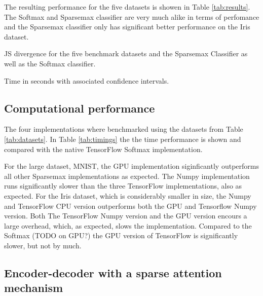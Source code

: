 The resulting performance for the five datasets is showen in Table \ref{tab:results}. The Softmax and Sparsemax classifier are very much alike in terms of perfomance and the Sparsemax classifier only has significant better performance on the Iris dataset.
\begin{table}[H]
\centering

\caption{JS divergence for the five benchmark datasets and the Sparsemax Classifier as well as the Softmax classifier.}
\label{tab:results}
\end{table}

\begin{table}
\centering

\caption{Time in seconds with associated confidence intervals.}
\label{tab:timings}
\end{table}

\subsection{Computational performance}
The four implementations where benchmarked using the datasets from Table \ref{tab:datasets}. In Table \ref{tab:timings} the the time performance is shown and compared with the native TensorFlow Softmax implementation.

For the large dataset, MNIST, the GPU implementation siginficantly outperforms all other Sparsemax implementations as expected. The Numpy implementation runs significantly slower than the three TensorFlow implementations, also as expected. For the Iris dataset, which is considerably smaller in size, the Numpy and TensorFlow CPU version outperforms both the GPU and Tensorflow Numpy version. Both The TensorFlow Numpy version and the GPU version encours a large overhead, which, as expected, slows the implementation. Compared to the Softmax (TODO on GPU?) the GPU version of TensorFlow is significantly slower, but not by much.


\subsection{Encoder-decoder with a sparse attention mechanism}


